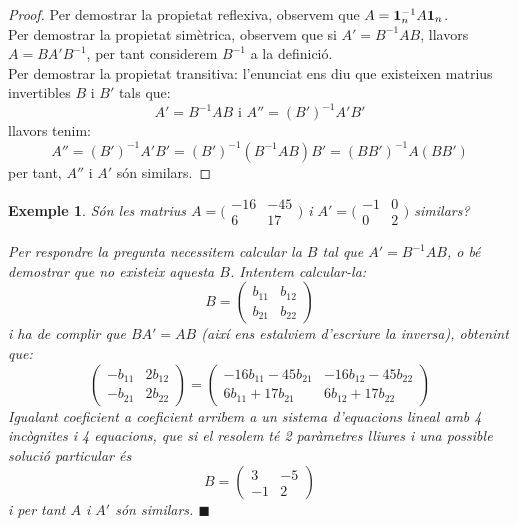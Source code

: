 \documentclass[
  11pt,
]{book}
\numberwithin{dummy}{section}
\theoremstyle{maincolornumbox}
\theoremstyle{blacknumex}
\newtheorem{exampleT}{Exemple}[chapter]
\theoremstyle{blacknumbox}
\theoremstyle{maincolornum}
\newenvironment{example}{\begin{exampleT}}{\hfill{\tiny\ensuremath{\blacksquare}}\end{exampleT}}
\newlength\esp
\begin{document}
\begin{proof}
Per demostrar la propietat reflexiva, observem que
\(A=\mathbf{1}_n^{-1} A \mathbf{1}_n\).\\
Per demostrar la propietat simètrica, observem que si \(A'=B^{-1}AB\),
llavors \(A=BA'B^{-1}\), per tant considerem \(B^{-1}\) a la definició.\\
Per demostrar la propietat transitiva: l'enunciat ens diu que existeixen
matrius invertibles \(B\) i \(B'\) tals que:
\[A'=B^{-1}AB \text{ i } A''=(B')^{-1}A'B'\] llavors tenim:
\[A''=(B')^{-1}A'B'=(B')^{-1}(B^{-1}AB)B'=(BB')^{-1}A(BB')\] per tant,
\(A''\) i \(A'\) són similars.
\end{proof}

\begin{example}
Són les matrius
\(A=\big(\begin{smallmatrix} -16 & -45 \\ 6 & 17\end{smallmatrix}\big)\)
i \(A'=\big(\begin{smallmatrix} -1 & 0 \\ 0 & 2 \end{smallmatrix}\big)\)
similars?

Per respondre la pregunta necessitem calcular la \(B\) tal que
\(A'=B^{-1}AB\), o bé demostrar que no existeix aquesta \(B\). Intentem
calcular-la:
\[B=\begin{pmatrix} b_{11} & b_{12} \\ b_{21} & b_{22} \end{pmatrix}\] i
ha de complir que \(BA'=AB\) (així ens estalviem d'escriure la inversa),
obtenint que: \[\begin{pmatrix}
    -b_{11} & 2b_{12} \\ -b_{21} & 2b_{22}
    \end{pmatrix}
    =
    \begin{pmatrix}
    -16b_{11}-45b_{21} & -16b_{12}-45b_{22}\\ 6b_{11}+17b_{21} & 6b_{12}+17b_{22}
    \end{pmatrix}\] Igualant coeficient a coeficient arribem a un
sistema d'equacions lineal amb 4 incògnites i 4 equacions, que si el
resolem té 2 paràmetres lliures i una possible solució particular és
\[B=\begin{pmatrix}
    3 & -5 \\  -1 & 2 
    \end{pmatrix}\] i per tant \(A\) i \(A'\) són similars.
\end{example}
\end{document}
